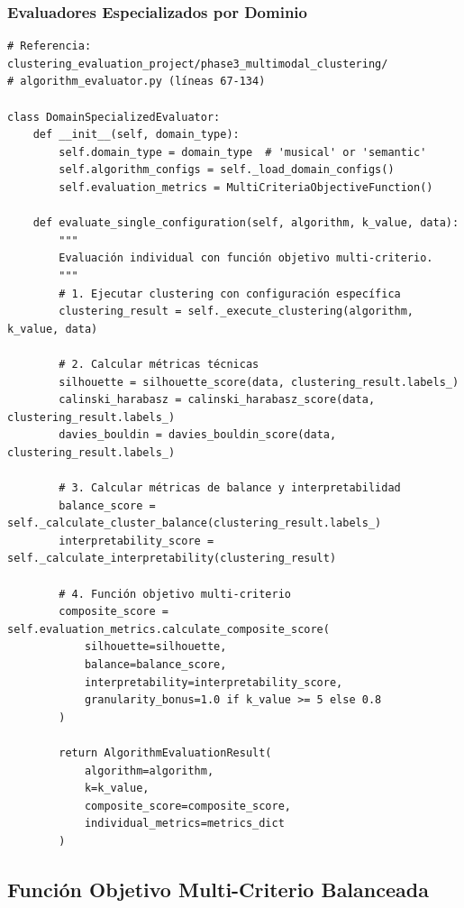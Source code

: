 \documentclass[12pt,a4paper]{article}
\begin{document}
\subsubsection{Evaluadores Especializados por Dominio}

\begin{lstlisting}[caption={Evaluadores Especializados por Dimensionalidad}]
# Referencia: clustering_evaluation_project/phase3_multimodal_clustering/
# algorithm_evaluator.py (líneas 67-134)

class DomainSpecializedEvaluator:
    def __init__(self, domain_type):
        self.domain_type = domain_type  # 'musical' or 'semantic'
        self.algorithm_configs = self._load_domain_configs()
        self.evaluation_metrics = MultiCriteriaObjectiveFunction()

    def evaluate_single_configuration(self, algorithm, k_value, data):
        """
        Evaluación individual con función objetivo multi-criterio.
        """
        # 1. Ejecutar clustering con configuración específica
        clustering_result = self._execute_clustering(algorithm, k_value, data)

        # 2. Calcular métricas técnicas
        silhouette = silhouette_score(data, clustering_result.labels_)
        calinski_harabasz = calinski_harabasz_score(data, clustering_result.labels_)
        davies_bouldin = davies_bouldin_score(data, clustering_result.labels_)

        # 3. Calcular métricas de balance y interpretabilidad
        balance_score = self._calculate_cluster_balance(clustering_result.labels_)
        interpretability_score = self._calculate_interpretability(clustering_result)

        # 4. Función objetivo multi-criterio
        composite_score = self.evaluation_metrics.calculate_composite_score(
            silhouette=silhouette,
            balance=balance_score,
            interpretability=interpretability_score,
            granularity_bonus=1.0 if k_value >= 5 else 0.8
        )

        return AlgorithmEvaluationResult(
            algorithm=algorithm,
            k=k_value,
            composite_score=composite_score,
            individual_metrics=metrics_dict
        )
\end{lstlisting}

\subsection{Función Objetivo Multi-Criterio Balanceada}
\end{document}
